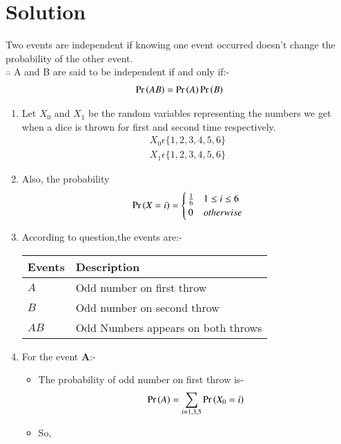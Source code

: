 \documentclass[journal,12pt,twocolumn]{IEEEtran}
\begin{document}
\section{Solution}
\begin{lemma}
Two events are independent if knowing one event occurred doesn't change the probability of the other event.
\\
$\therefore$ A and B are said to be independent if and only if:-
\begin{align}
\Pr\left(AB\right)=\Pr\left(A\right)\Pr\left(B\right)   
\end{align}
\label{lemma1}
\end{lemma} 
\begin{enumerate}
\item Let $X_0$ and $X_1$ be the random variables representing the numbers we get  when a dice is thrown for first and second time respectively.
\begin{align}
    X_0\epsilon\{1,2,3,4,5,6\}
    \\
     X_1\epsilon\{1,2,3,4,5,6\}
\end{align}
\item Also, the probability
\begin{align}
\Pr\left(X=i\right)=\begin{cases}
	\frac{1}{6}& 1 \le i \le 6\\
	0 & otherwise
	\end{cases}
\end{align}
\item According to question,the events are:-
\begin{table}[ht!]
\begin{tabular}{|l|l|}
\hline
\textbf{Events} & \textbf{Description}                         \\ \hline
$A$ & Odd number on first throw
\\ \hline
$B$ & Odd number on second throw 
\\ \hline
$AB$ & Odd Numbers appears on both throws \\ \hline
\end{tabular}
\end{table}
\item For the event \textbf{A}:-
\begin{itemize}
    \item The probability of odd number on first throw is-
    \begin{align}
        \Pr\left(A\right)=\sum_{i=1,3,5} \Pr\left(X_0=i\right)
    \end{align}
    \item So,

\end{itemize}
\end{enumerate}
\end{document}
